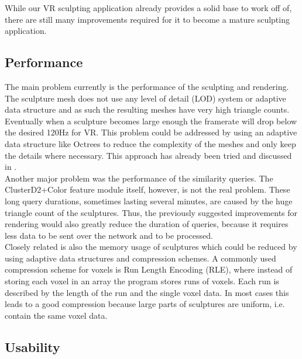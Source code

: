 While our VR sculpting application already provides a solid base to work off of, there are still many improvements required for it to become a mature sculpting application.

\subsection{Performance}
The main problem currently is the performance of the sculpting and rendering. The sculpture mesh does not use any level of detail (LOD) system or adaptive data structure and as such the resulting meshes have very high triangle counts.
Eventually when a sculpture becomes large enough the framerate will drop below the desired 120Hz for VR. This problem could be addressed by using an adaptive data structure like Octrees to reduce the complexity of the meshes and only keep the details where necessary. This approach has already been tried and discussed in \cite{dual_contouring}.\\
Another major problem was the performance of the similarity queries. The ClusterD2+Color feature module itself, however, is not the real problem. These long query durations, sometimes lasting several minutes, are caused by the huge triangle count of the sculptures. Thus, the previously suggested improvements for rendering would also greatly reduce the duration of queries, because it requires less data to be sent over the network and to be processed.\\
Closely related is also the memory usage of sculptures which could be reduced by using adaptive data structures and compression schemes. A commonly used compression scheme for voxels is Run Length Encoding (RLE), where instead of storing
each voxel in an array the program stores runs of voxels. Each run is described by the length of the run and the single voxel data. In most cases this leads to a good compression because large parts of sculptures are uniform, i.e. contain the same voxel data.

\subsection{Usability}

